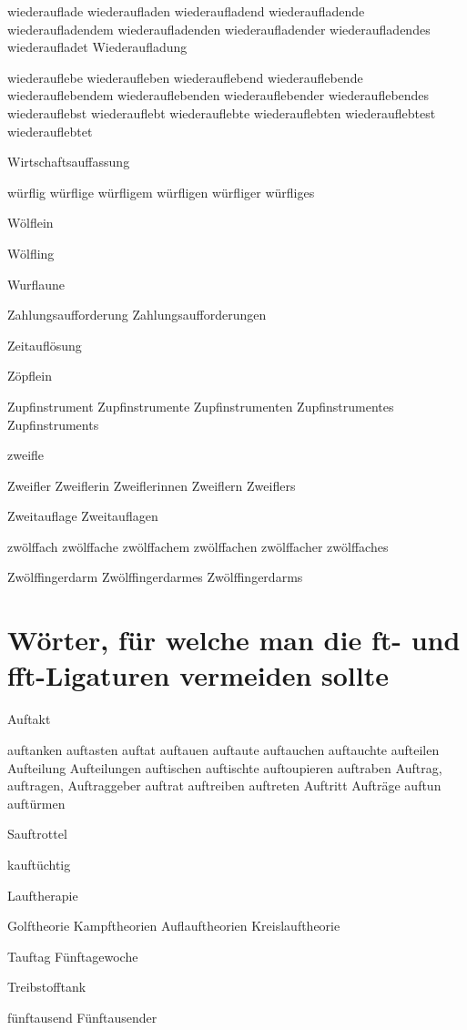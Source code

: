 wiederauflade wiederaufladen wiederaufladend wiederaufladende wiederaufladendem wiederaufladenden wiederaufladender wiederaufladendes wiederaufladet Wiederaufladung

wiederauflebe wiederaufleben wiederauflebend wiederauflebende wiederauflebendem wiederauflebenden wiederauflebender wiederauflebendes wiederauflebst wiederauflebt wiederauflebte wiederauflebten wiederauflebtest wiederauflebtet

Wirtschaftsauffassung


würflig würflige würfligem würfligen würfliger würfliges

Wölflein

Wölfling

Wurflaune

Zahlungsaufforderung Zahlungsaufforderungen

Zeitauflösung

Zöpflein

Zupfinstrument Zupfinstrumente Zupfinstrumenten Zupfinstrumentes Zupfinstruments

zweifle 

Zweifler Zweiflerin Zweiflerinnen Zweiflern Zweiflers

Zweitauflage Zweitauflagen

zwölffach zwölffache zwölffachem zwölffachen zwölffacher zwölffaches

Zwölffingerdarm Zwölffingerdarmes Zwölffingerdarms
  



\section*{Wörter, für welche man die ft- und fft-Ligaturen vermeiden sollte}

Auftakt

auftanken auftasten auftat
auftauen auftaute
auftauchen auftauchte
aufteilen Aufteilung Aufteilungen
auftischen auftischte auftoupieren
auftraben
Auftrag, auftragen, Auftraggeber
auftrat
auftreiben
auftreten
Auftritt
Aufträge
auftun auftürmen 

Sauftrottel

kauftüchtig

Lauftherapie 

Golftheorie Kampftheorien Auflauftheorien Kreislauftheorie

Tauftag Fünftagewoche

Treibstofftank

fünftausend Fünftausender

